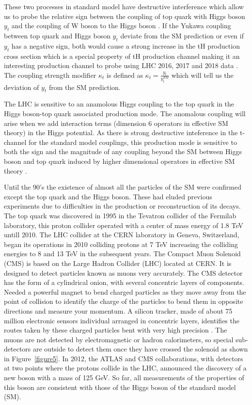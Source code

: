 \documentclass[final,3p]{CSP}
\begin{document}
 These two processes in standard model have destructive interference which allow us to 
probe the relative sign between 
the coupling of top quark with Higgs boson $y_t$ and the coupling of W boson to the Higgs 
boson \cite{choudhury2019search}. If the Yukawa coupling between top quark and Higgs boson $y_t$ deviate from the SM 
prediction or even if $y_t$ has a negative sign, both would cause a strong increase in the tH 
production cross section which is a special property of tH production channel making it an 
interesting production channel to probe using LHC 2016, 2017 and 2018 data \cite{farina2013lifting}. The coupling 
strength modifier $\kappa_t$ is defined as $\kappa_t = \frac{y_t}{y^{SM}_t}$ which will tell 
us the deviation of $y_t$ from the SM prediction. 

The LHC is sensitive to an anamolous Higgs coupling to the top quark in the Higgs boson-top quark associated production mode. 
The anomalous coupling will arise when we add interaction terms (dimension 6 operators in effective SM theory) in the Higgs potential.
As there is strong destructive inteference in the t-channel for the standard model  couplings, this production mode is sensitive to both the sign and the magnitude of any coupling beyond the SM between Higgs  boson and top quark induced by  higher dimensional operators in effective SM theory \cite{sirunyan2019search}.

Until the 90's the existence of almost all the particles of the SM were confirmed except the top quark and the Higgs boson. 
These had eluded previous experiments due to difficulties in the production or reconstruction of its decays. The top quark was 
discovered in 1995 in the Tevatron collider of the Fermilab laboratory, this proton collider operated with a center of mass 
energy of 1.8 TeV untill 2010. The LHC collider at the CERN laboratory in Geneva, Switzerland, began its operations in 2010 
colliding protons at 7 TeV increasing the colliding energies to 8 and 13 TeV in the subsequent years. The Compact Muon Solenoid (CMS) is based on the Large Hadron Collider (LHC) located at CERN. It is designed to detect particles known as muons very accurately. The CMS detector has the form of a cylindrical onion, with several concentric layers of components. Needed a powerful magnet to bend charged particles as they move away from the point of collision to identify the charge of the particles to bend them in opposite directions and measure your momentum. A silicon tracker, made of about 75 
million electronic sensors individual arranged in concentric layers, identifies the routes taken by these charged particles bent with very high precision \cite{Chatrchyan:2008aa}. The muons are not detected by electromagnetic or hadron calorimeters, so special sub-detectors are outside to detect them once they have crossed the solenoid as shown in Figure~\ref{figure5}. In 2012, the ATLAS and CMS collaborations, with detectors at two points where the protons collide in the LHC, announced the discovery of a new boson with a mass of 125 GeV. So far, all measurements of the properties of this boson are consistent with those of the Higgs boson of the standard model (SM).
\end{document}
